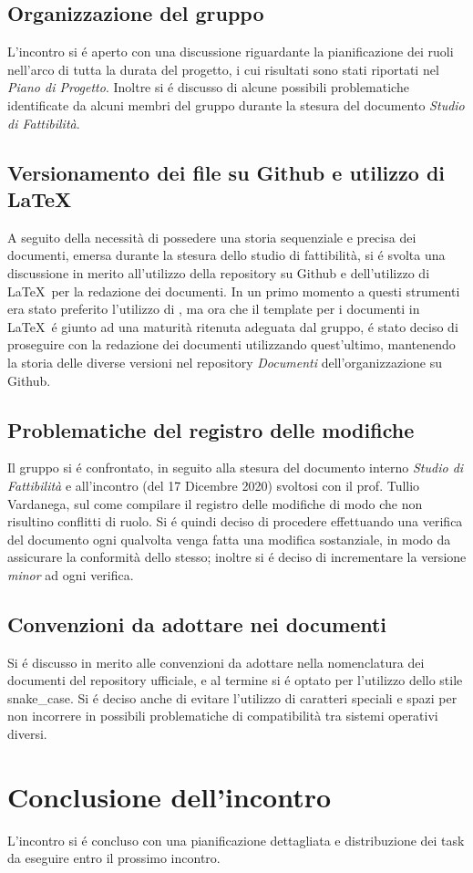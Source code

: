 \documentclass{article}
\begin{document}
	\subsection{Organizzazione del gruppo}
	\label{sub:organizzazione_gruppo}
	L'incontro si é aperto con una discussione riguardante la pianificazione dei ruoli nell'arco di tutta la durata del progetto, i cui risultati sono stati riportati nel 
	\textit{Piano di Progetto}. Inoltre si é discusso di alcune possibili problematiche identificate da alcuni membri del gruppo durante la stesura del documento 
	\textit{Studio di Fattibilità}.
	
	\subsection{Versionamento dei file su Github e utilizzo di \LaTeX}
	\label{sub:git_latex}
	A seguito della necessità di possedere una storia sequenziale e precisa dei documenti, emersa durante la stesura dello studio di fattibilità, si é svolta una discussione in merito 
	all'utilizzo della repository su Github e dell'utilizzo di \LaTeX\ per la redazione dei documenti. In un primo momento a questi strumenti era stato preferito 
	l'utilizzo di , ma ora che il template per i documenti in \LaTeX\ é giunto ad una maturità ritenuta adeguata dal gruppo, é stato deciso di 
	proseguire con la redazione dei documenti utilizzando quest'ultimo, mantenendo la storia delle diverse versioni nel repository \textit{Documenti} dell'organizzazione 
	 su Github.

	\subsection{Problematiche del registro delle modifiche}
	\label{sub:registro_modifiche}
	Il gruppo si é confrontato, in seguito alla stesura del documento interno \textit{Studio di Fattibilità} e all'incontro (del 17 Dicembre 2020) svoltosi con il prof. Tullio 
	Vardanega, sul come compilare il registro delle modifiche di modo che non risultino conflitti di ruolo. Si é quindi deciso di procedere effettuando una verifica del documento ogni 
	qualvolta venga fatta una modifica sostanziale, in modo da assicurare la conformità dello stesso; inoltre si é deciso di incrementare la versione \textit{minor} ad ogni verifica.

	\subsection{Convenzioni da adottare nei documenti}
	\label{sub:convenzioni}
	Si é discusso in merito alle convenzioni da adottare nella nomenclatura dei documenti del repository ufficiale, e al termine si é optato per l'utilizzo dello stile \glossario
	{snake\_case}. Si é deciso anche di evitare l'utilizzo di caratteri speciali e spazi per non incorrere in possibili problematiche di compatibilità tra sistemi operativi diversi.

\section{Conclusione dell'incontro}
\label{sec:conclusione}
L'incontro si é concluso con una pianificazione dettagliata e distribuzione dei task da eseguire entro il prossimo incontro.
\end{document}
